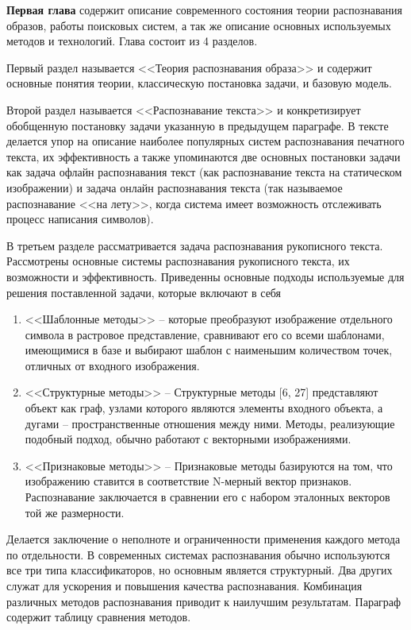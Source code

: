 \textbf{Первая глава} содержит описание современного состояния теории распознавания образов, работы поисковых систем, а так же описание основных используемых методов и технологий. Глава состоит из 4 разделов. 

Первый раздел называется <<Теория распознавания образа>> и содержит основные понятия теории,  классическую постановка задачи, и базовую модель.

Второй раздел называется <<Распознавание текста>> и конкретизирует обобщенную постановку задачи указанную в предыдущем параграфе. В тексте делается упор на описание наиболее популярных систем распознавания печатного текста, их эффективность а также упоминаются две основных постановки задачи как задача офлайн распознавания текст (как распознавание текста на статическом изображении) и задача онлайн распознавания текста (так называемое распознавание <<на лету>>, когда система имеет возможность отслеживать процесс написания символов).

В третьем разделе рассматривается задача распознавания рукописного текста. Рассмотрены основные системы распознавания рукописного текста, их возможности и эффективность. Приведенны основные подходы используемые для решения поставленной задачи, которые включают в себя 

\begin{enumerate}
\item  <<Шаблонные методы>> -- которые преобразуют изображение отдельного символа в растровое представление, сравнивают его со всеми шаблонами, имеющимися в базе и выбирают шаблон с наименьшим количеством точек, отличных от входного изображения.

\item <<Структурные методы>> -- Структурные методы [6, 27] представляют объект как граф, узлами которого являются элементы входного объекта, а дугами – пространственные отношения между ними. Методы, реализующие подобный подход, обычно работают с векторными изображениями.

\item <<Признаковые методы>> -- Признаковые методы базируются на том, что изображению ставится в соответствие N-мерный вектор признаков. Распознавание заключается в сравнении его с набором эталонных векторов той же размерности.
\end{enumerate}

\noindent
Делается заключение о неполноте и ограниченности применения каждого метода по отдельности. В современных системах распознавания обычно используются все три типа классификаторов, но основным является структурный. Два других служат для ускорения и повышения качества распознавания. Комбинация различных методов распознавания приводит к наилучшим результатам. Параграф содержит таблицу сравнения методов.

